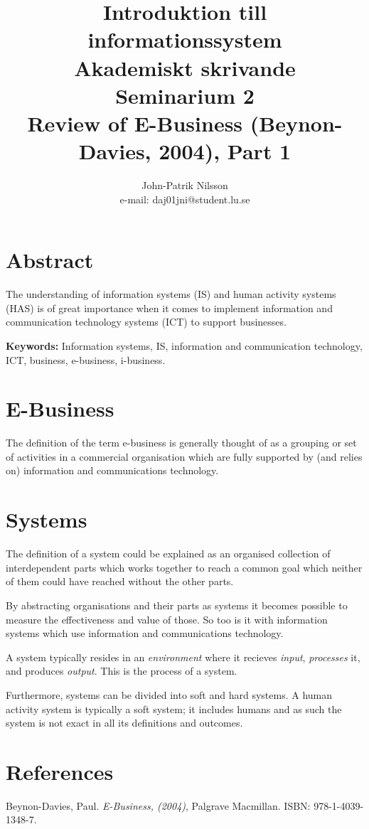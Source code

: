 \documentclass[a4paper,10pt]{article}
\title{Introduktion till informationssystem \\
	Akademiskt skrivande \\
    Seminarium 2 \\
    Review of E-Business (Beynon-Davies, 2004), Part 1}
\author{John-Patrik Nilsson \\
	e-mail: daj01jni@student.lu.se}
\begin{document}
\maketitle

\pagestyle{empty}
\thispagestyle{empty}

\section{Abstract}
The understanding of information systems (IS) and human activity systems (HAS) is of great importance when it comes to implement information and communication technology systems (ICT) to support businesses.

\textbf{Keywords:} Information systems, IS, information and communication technology, ICT, business, e-business, i-business.

\section{E-Business}
The definition of the term e-business is generally thought of as a grouping or set of activities in a commercial organisation which are fully supported by (and relies on) information and communications technology.

\section{Systems}
The definition of a system could be explained as an organised collection of interdependent parts which works together to reach a common goal which neither of them could have reached without the other parts.

By abstracting organisations and their parts as systems it becomes possible to measure the effectiveness and value of those. So too is it with information systems which use information and communications technology.

A system typically resides in an \textit{environment} where it recieves \textit{input}, \textit{processes} it, and produces \textit{output}. This is the process of a system.

Furthermore, systems can be divided into soft and hard systems. A human activity system is typically a soft system; it includes humans and as such the system is not exact in all its definitions and outcomes.

\appendix
\section{References}
Beynon-Davies, Paul. \textit{E-Business, (2004)}, Palgrave Macmillan. ISBN: 978-1-4039-1348-7.
\end{document}
